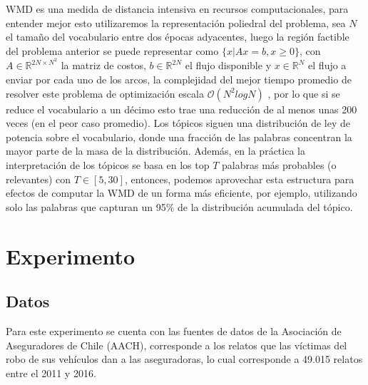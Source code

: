 \documentclass[letterpaper,12pt,oneside]{book} %
\begin{document}
WMD es una medida de distancia intensiva en recursos computacionales, para entender mejor esto utilizaremos la representación poliedral del problema, sea $N$ el tamaño del vocabulario entre dos épocas adyacentes, luego la región factible del problema anterior se puede representar como $\{x| Ax=b, x\geq 0\}$, con $A\in \mathbb{R}^{2N\times N^{2}}$ la matriz de costos, $b\in \mathbb{R}^{2N}$ el flujo disponible y $x\in \mathbb{R}^{N}$ el flujo a enviar por cada uno de los arcos, la complejidad del mejor tiempo promedio de resolver este problema de optimización escala $\mathcal{O}(N^{2}log N)$ \citep{pele2009fast}, por lo que si se reduce el vocabulario a un décimo esto trae una reducción de al menos unas 200 veces (en el peor caso promedio). Los tópicos siguen una distribución de ley de potencia sobre el vocabulario, donde una fracción de las palabras concentran la mayor parte de la masa de la distribución. Además, en la práctica la interpretación de los tópicos se basa en los top $T$ palabras más probables (o relevantes) con $T \in [5, 30]$, entonces, podemos aprovechar esta estructura para efectos de computar la WMD de un forma más eficiente, por ejemplo, utilizando solo las palabras que capturan un 95\% de la distribución acumulada del tópico.




\chapter{Experimento}


\section{Datos}

Para este experimento se cuenta con las fuentes de datos de la Asociación de Aseguradores de Chile (AACH), corresponde a los relatos que las víctimas del robo de sus vehículos dan a las aseguradoras, lo cual corresponde a 49.015 relatos entre el 2011 y 2016.\\

\end{document}
